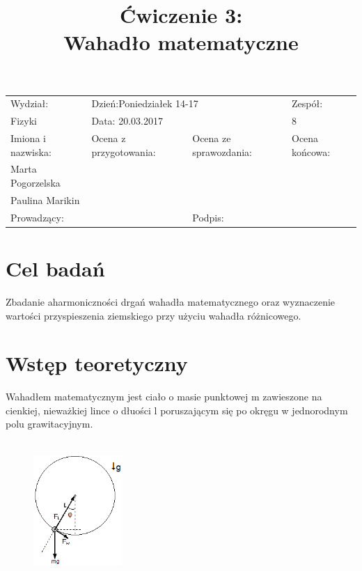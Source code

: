 \documentclass[a4paper,10pt]{article}
\def\arraystretch{1.2}
\begin{document}
\begin{table}
  \centering
  \def\arraystretch{1.5}
    \begin{tabular}{|l|l|l|l|} \hline
    Wydział:           & \multicolumn{2}{l|}{Dzień:Poniedziałek 14-17}    &Zespół:  \\
    Fizyki             &    \multicolumn{2}{l|}{Data: 20.03.2017}         &8             \\\hline
    Imiona i nazwiska: &Ocena z przygotowania:  &Ocena ze sprawozdania:   &Ocena końcowa: \\
    Marta Pogorzelska  &                        &                         &                \\
    Paulina Marikin    &                        &                         &\\\hline
    \multicolumn{2}{|l|}{Prowadzący:                 } &\multicolumn{2}{l|}{Podpis:             }  \\\hline
  \end{tabular}
\end{table}

\title{Ćwiczenie 3:\\Wahadło matematyczne}
\date{}
\maketitle{}

\section{Cel badań}
Zbadanie aharmoniczności drgań wahadła matematycznego oraz wyznaczenie wartości przyspieszenia ziemskiego przy użyciu wahadła różnicowego.

\section{Wstęp teoretyczny}
Wahadłem matematycznym jest ciało o masie punktowej m zawieszone na cienkiej, nieważkiej lince o dłuości l poruszającym się po okręgu w jednorodnym polu grawitacyjnym.
\\
\\
\begin{figure}[H]
\centering
\includegraphics[width=0.3\textwidth]{wahadlo.png}
\end{figure}
\end{document}
